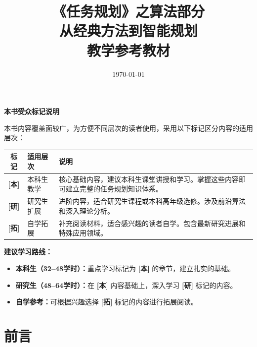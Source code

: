 \documentclass[a4paper,12pt,openany]{ctexbook}
\title{{\Huge\bfseries 《任务规划》之算法部分}\\[1em]
{\Large 从经典方法到智能规划}\\[2em]
{\normalsize\color{gray} 教学参考教材}}
\author{}
\date{\today}
\newcommand{\ug}{\texorpdfstring{\textcolor{ugcolor}{\textbf{[本]}}}{[本]}}
\newcommand{\grad}{\texorpdfstring{\textcolor{gradcolor}{\textbf{[研]}}}{[研]}}
\newcommand{\self}{\texorpdfstring{\textcolor{selfcolor}{\textbf{[拓]}}}{[拓]}}
\theoremstyle{definition}
\theoremstyle{plain}
\begin{document}
\maketitle

\thispagestyle{empty}
\vspace*{3cm}
\begin{center}
{\Large\bfseries 本书受众标记说明}
\end{center}
\vspace{1cm}

\noindent 本书内容覆盖面较广，为方便不同层次的读者使用，采用以下标记区分内容的适用层次：

\vspace{1em}

\begin{center}
\begin{tabular}{clp{8cm}}
\toprule
\textbf{标记} & \textbf{适用层次} & \textbf{说明} \\
\midrule
\textcolor{ugcolor}{\textbf{[本]}} & 本科生教学 & 核心基础内容，建议本科生课堂讲授和学习。掌握这些内容即可建立完整的任务规划知识体系。 \\[0.5em]
\textcolor{gradcolor}{\textbf{[研]}} & 研究生扩展 & 进阶内容，适合研究生课程或本科高年级选修。涉及前沿算法和深入理论分析。 \\[0.5em]
\textcolor{selfcolor}{\textbf{[拓]}} & 自学拓展 & 补充阅读材料，适合感兴趣的读者自学。包含最新研究进展和特殊应用领域。 \\
\bottomrule
\end{tabular}
\end{center}

\vspace{2em}
\noindent\textbf{建议学习路线：}
\begin{itemize}[leftmargin=2em]
  \item \textbf{本科生（32--48学时）：}重点学习标记为 \ug{} 的章节，建立扎实的基础。
  \item \textbf{研究生（48--64学时）：}在 \ug{} 内容基础上，深入学习 \grad{} 标记的内容。
  \item \textbf{自学参考：}可根据兴趣选择 \self{} 标记的内容进行拓展阅读。
\end{itemize}

\clearpage

\tableofcontents

\chapter*{前言}
\end{document}
